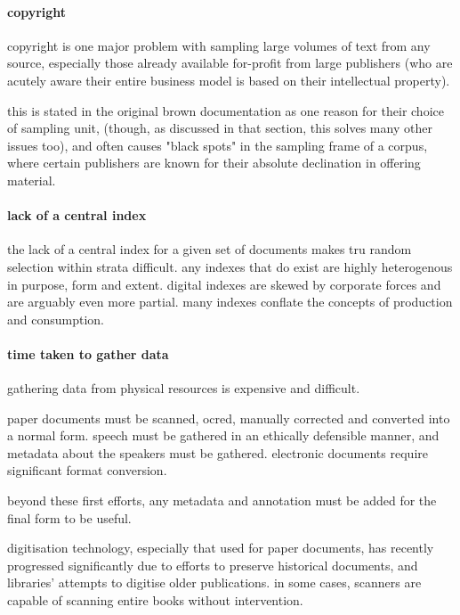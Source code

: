 \paragraph{ copyright}
copyright is one major problem with sampling large volumes of text from any source, especially those already available for-profit from large publishers (who are acutely aware their entire business model is based on their intellectual property).

this is stated in the original brown documentation as one reason for their choice of sampling unit, (though, as discussed in that section, this solves many other issues too), and often causes "black spots" in the sampling frame of a corpus, where certain publishers are known for their absolute declination in offering material.


\paragraph{ lack of a central index}
the lack of a central index for a given set of documents makes tru random selection within strata difficult.  any indexes that do exist are highly heterogenous in purpose, form and extent.  digital indexes are skewed by corporate forces and are arguably even more partial.  many indexes conflate the concepts of production and consumption.


\paragraph{ time taken to gather data}
gathering data from physical resources is expensive and difficult.  

paper documents must be scanned, ocred, manually corrected and converted into a normal form.  speech must be gathered in an ethically defensible manner, and metadata about the speakers must be gathered.  electronic documents require significant format conversion.

beyond these first efforts, any metadata and annotation must be added for the final form to be useful.

digitisation technology, especially that used for paper documents, has recently progressed significantly due to efforts to preserve historical documents, and libraries' attempts to digitise older publications.  in some cases, scanners are capable of scanning entire books without intervention.




